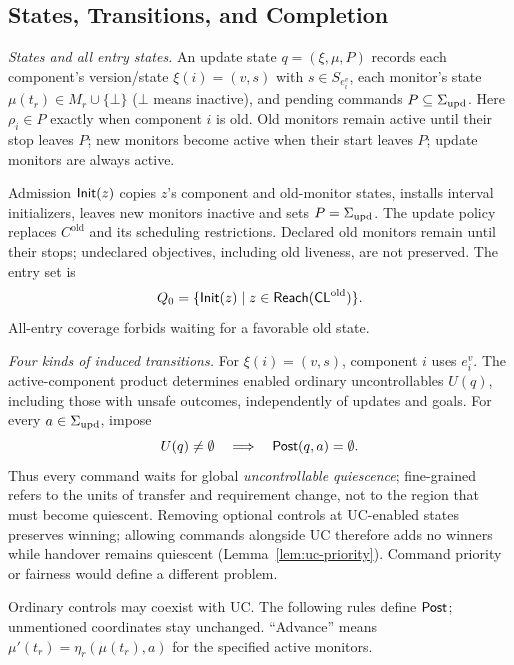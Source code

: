 \subsection{States, Transitions, and Completion}
\label{sec:game-rules}

\label{def:configuration}
\label{def:init}
\emph{States and all entry states.}
An update state $q=(\xi,\mu,P)$ records each component's version/state $\xi(i)=(v,s)$ with $s\in S_{e_i^v}$, each monitor's state $\mu(t_r)\in M_r\cup\{\bot\}$ ($\bot$ means inactive), and pending commands $P\subseteq\Sigma_{\mathrm{upd}}$.
Here $\rho_i\in P$ exactly when component $i$ is old. Old monitors remain active until their stop leaves $P$; new monitors become active when their start leaves $P$; update monitors are always active. 

Admission $\mathsf{Init}(z)$ copies $z$'s component and old-monitor states, installs interval initializers, leaves new monitors inactive and sets $P=\Sigma_{\mathrm{upd}}$. The update policy replaces $C^{\mathrm{old}}$ and its scheduling restrictions. Declared old monitors remain until their stops; undeclared objectives, including old liveness, are not preserved. The entry set is
\begin{equation}
 Q_0=\{\mathsf{Init}(z)\mid
 z\in\mathsf{Reach}(\mathsf{CL}^{\mathrm{old}})\}.
\label{eq:initial}
\end{equation}
All-entry coverage forbids waiting for a favorable old state.
\par\noindent\emph{Four kinds of induced transitions.}
\label{def:successor}
For $\xi(i)=(v,s)$, component $i$ uses $e_i^v$. The active-component product determines enabled ordinary uncontrollables $U(q)$, including those with unsafe outcomes, independently of updates and goals. For every $a\in\Sigma_{\mathrm{upd}}$, impose
\begin{equation}
 U(q)\ne\emptyset\quad\Longrightarrow\quad\mathsf{Post}(q,a)=\emptyset.
 \label{eq:nonpreemption}
\end{equation}
Thus every command waits for global \emph{uncontrollable quiescence}; fine-grained refers to the units of transfer and requirement change, not to the region that must become quiescent. Removing optional controls at UC-enabled states preserves winning; allowing commands alongside UC therefore adds no winners while handover remains quiescent (Lemma~\ref{lem:uc-priority}). Command priority or fairness would define a different problem.

Ordinary controls may coexist with UC. The following rules define $\mathsf{Post}$; unmentioned coordinates stay unchanged. ``Advance'' means $\mu'(t_r)=\eta_r(\mu(t_r),a)$ for the specified active monitors.

